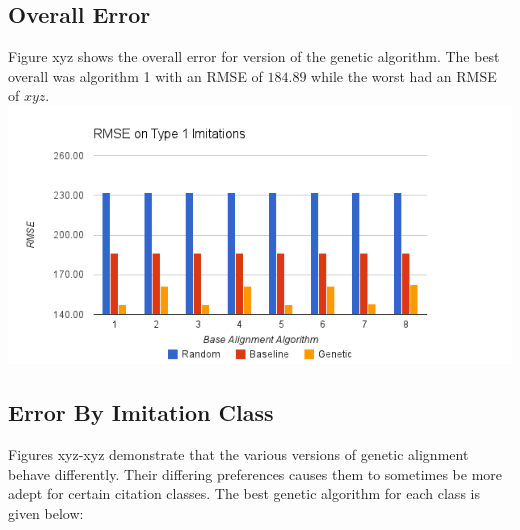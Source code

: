 \subsection{Overall Error}
Figure xyz %
shows the overall error for version of the genetic algorithm. The best overall was algorithm 1 with an RMSE of $184.89$ while the worst had an RMSE of $xyz$.
\includegraphics[width=16cm]{images/chart1.png}

\subsection{Error By Imitation Class}
Figures xyz-xyz %
demonstrate that the various versions of genetic alignment behave differently. Their differing preferences causes them to sometimes be more adept for certain citation classes. The best genetic algorithm for each class is given below:


